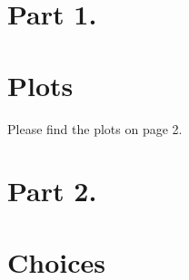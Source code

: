 \documentclass[12pt]{article}
\begin{document}
\maketitle

\section{Part 1. }

\section{Plots}\label{plots}
Please find the plots on page 2. \\

\section{Part 2. }

\section{Choices}\label{choices}
\end{document}
